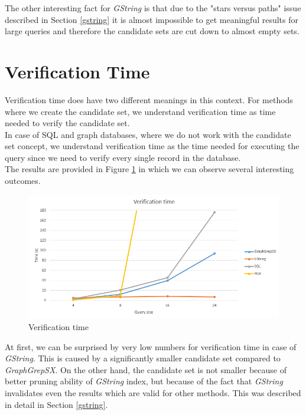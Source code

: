 The other interesting fact for \textit{GString} is that due to the "stars versus paths" issue described in Section \ref{gstring} it is almost impossible to get meaningful results for large queries and therefore the candidate sets are cut down to almost empty sets.

\section{Verification Time}

Verification time does have two different meanings in this context. For methods where we create the candidate set, we understand verification time as time needed to verify the candidate set.\\

In case of SQL and graph databases, where we do not work with the candidate set concept, we understand verification time as the time needed for executing the query since we need to verify every single record in the database.\\

The results are provided in Figure \ref{fig:verification} in which we can observe several interesting outcomes.\\

\begin{figure}[h]
	\centering
	\includegraphics[width=1\textwidth]{../img/verification.png}
	\caption{Verification time}
	\label{fig:verification}
\end{figure}

At first, we can be surprised by very low numbers for verification time in case of \textit{GString}. This is caused by a significantly smaller candidate set compared to \textit{GraphGrepSX}. On the other hand, the candidate set is not smaller because of better pruning ability of \textit{GString} index, but because of the fact that \textit{GString} invalidates even the results which are valid for other methods. This was described in detail in Section \ref{gstring}.\\

